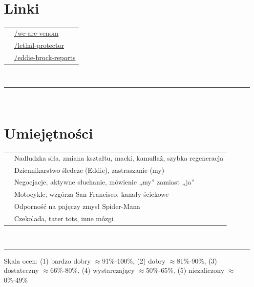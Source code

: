 \documentclass[oneside]{article}
\begin{document}
{\begin{minipage}[t][\textheight-2\fboxsep-2\fboxrule][t]{\dimexpr0.40\textwidth-2\fboxrule-2\fboxsep\relax}
        \section*{\large Linki}
        \begin{tabular}{cl}
            \faGithub{}   & \href{https://github.com/example}{/we-are-venom} \\
            \faLinkedin{} & \href{https://www.linkedin.com/in/example/}{/lethal-protector} \\
            \faNewspaper{} & \href{https://example.com}{/eddie-brock-reports} \\
        \end{tabular}
        \vspace{10pt} \\
        \rule{\linewidth}{0.4pt} \\
        \section*{\large Umiejętności}
        \begin{tabularx}{\textwidth}{cY}
            \faDumbbell{}    & Nadludzka siła, zmiana kształtu, macki, kamuflaż, szybka regeneracja \\
            \faPen*{}        & Dziennikarstwo śledcze (Eddie), zastraszanie (my) \\
            \faFont{}        & Negocjacje, aktywne słuchanie, mówienie „my” zamiast „ja” \\
            \faCogs{}        & Motocykle, wzgórza San Francisco, kanały ściekowe \\
            \faLaptopCode{}  & Odporność na pajęczy zmysł Spider-Mana \\
            \faToolbox{}     & Czekolada, tater tots, inne mózgi
        \end{tabularx}
        \vspace{1pt} \\
        \rule{\linewidth}{0.4pt}
        \vfill
        {\tiny Skala ocen: (1) bardzo dobry $\approx$91\%-100\%, (2) dobry $\approx$81\%-90\%, (3) dostateczny $\approx$66\%-80\%, (4) wystarczający $\approx$50\%-65\%, (5) niezaliczony $\approx$0\%-49\%}
    \end{minipage}
}
\end{document}
